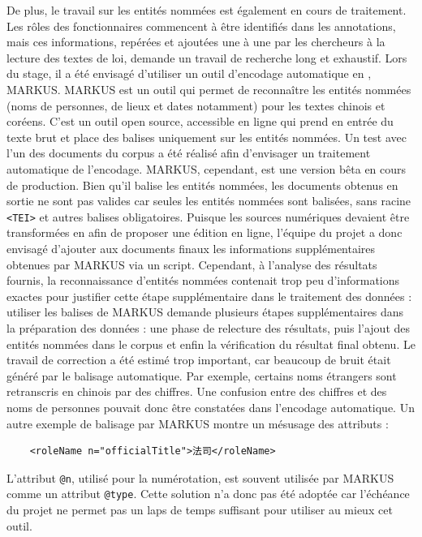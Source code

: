 De plus, le travail sur les entités nommées est également en cours de traitement. Les rôles des fonctionnaires commencent à être identifiés dans les annotations, mais ces informations, repérées et ajoutées une à une par les chercheurs à la lecture des textes de loi, demande un travail de recherche long et exhaustif. Lors du stage, il a été envisagé d'utiliser un outil d'encodage automatique en \TEI, MARKUS. MARKUS est un outil qui permet de reconnaître les entités nommées (noms de personnes, de lieux et dates notamment) pour les textes chinois et coréens. C'est un outil open source, accessible en ligne qui prend en entrée du texte brut et place des balises \TEI uniquement sur les entités nommées. Un test avec l'un des documents du corpus a été réalisé afin d'envisager un traitement automatique de l'encodage. MARKUS, cependant, est une version bêta en cours de production. Bien qu'il balise les entités nommées, les documents \TEI obtenus en sortie ne sont pas valides car seules les entités nommées sont balisées, sans racine \texttt{<TEI>} et autres balises obligatoires. Puisque les sources numériques devaient être transformées en \TEI afin de proposer une édition en ligne, l'équipe du projet a donc envisagé d'ajouter aux documents \TEI finaux les informations supplémentaires obtenues par MARKUS via un script. Cependant, à l'analyse des résultats fournis, la reconnaissance d'entités nommées contenait trop peu d'informations exactes pour justifier cette étape supplémentaire dans le traitement des données : utiliser les balises de MARKUS demande plusieurs étapes supplémentaires dans la préparation des données : une phase de relecture des résultats, puis l'ajout des entités nommées dans le corpus \TEI et enfin la vérification du résultat final obtenu. Le travail de correction a été estimé trop important, car beaucoup de bruit était généré par le balisage automatique. Par exemple, certains noms étrangers sont retranscris en chinois par des chiffres. Une confusion entre des chiffres et des noms de personnes pouvait donc être constatées dans l'encodage automatique. Un autre exemple de balisage par MARKUS montre un mésusage des attributs \TEI : 

\begin{verbatim}
    <roleName n="officialTitle">法司</roleName>
\end{verbatim}

L'attribut \texttt{@n}, utilisé pour la numérotation, est souvent utilisée par MARKUS comme un attribut \texttt{@type}. Cette solution n'a donc pas été adoptée car l'échéance du projet ne permet pas un laps de temps suffisant pour utiliser au mieux cet outil. 

